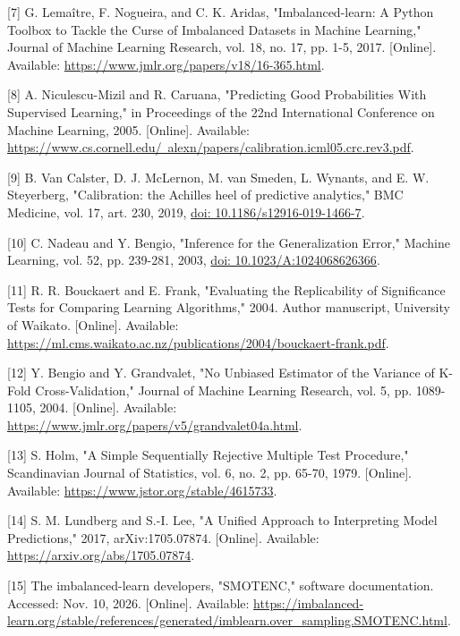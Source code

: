\documentclass[10pt,twocolumn,letterpaper]{article}
\begin{document}
[7] G. Lemaître, F. Nogueira, and C. K. Aridas, "Imbalanced-learn: A Python Toolbox to Tackle the Curse of Imbalanced Datasets in Machine Learning," Journal of Machine Learning Research, vol. 18, no. 17, pp. 1-5, 2017. [Online]. Available: \href{https://www.jmlr.org/papers/v18/16-365.html}{https://www.jmlr.org/papers/v18/16-365.html}.


[8] A. Niculescu-Mizil and R. Caruana, "Predicting Good Probabilities With Supervised Learning," in Proceedings of the 22nd International Conference on Machine Learning, 2005. [Online]. Available: \href{https://www.cs.cornell.edu/~alexn/papers/calibration.icml05.crc.rev3.pdf}{https://www.cs.cornell.edu/~alexn/papers/calibration.icml05.crc.rev3.pdf}.


[9] B. Van Calster, D. J. McLernon, M. van Smeden, L. Wynants, and E. W. Steyerberg, "Calibration: the Achilles heel of predictive analytics," BMC Medicine, vol. 17, art. 230, 2019, \href{https://doi.org/10.1186/s12916-019-1466-7}{doi: 10.1186/s12916-019-1466-7}.


[10] C. Nadeau and Y. Bengio, "Inference for the Generalization Error," Machine Learning, vol. 52, pp. 239-281, 2003, \href{https://doi.org/10.1023/A:1024068626366}{doi: 10.1023/A:1024068626366}.


[11] R. R. Bouckaert and E. Frank, "Evaluating the Replicability of Significance Tests for Comparing Learning Algorithms," 2004. Author manuscript, University of Waikato. [Online]. Available: \href{https://ml.cms.waikato.ac.nz/publications/2004/bouckaert-frank.pdf}{https://ml.cms.waikato.ac.nz/publications/2004/bouckaert-frank.pdf}.


[12] Y. Bengio and Y. Grandvalet, "No Unbiased Estimator of the Variance of K-Fold Cross-Validation," Journal of Machine Learning Research, vol. 5, pp. 1089-1105, 2004. [Online]. Available: \href{https://www.jmlr.org/papers/v5/grandvalet04a.html}{https://www.jmlr.org/papers/v5/grandvalet04a.html}.


[13] S. Holm, "A Simple Sequentially Rejective Multiple Test Procedure," Scandinavian Journal of Statistics, vol. 6, no. 2, pp. 65-70, 1979. [Online]. Available: \href{https://www.jstor.org/stable/4615733}{https://www.jstor.org/stable/4615733}.


[14] S. M. Lundberg and S.-I. Lee, "A Unified Approach to Interpreting Model Predictions," 2017, arXiv:1705.07874. [Online]. Available: \href{https://arxiv.org/abs/1705.07874}{https://arxiv.org/abs/1705.07874}.


[15] The imbalanced-learn developers, "SMOTENC," software documentation. Accessed: Nov. 10, 2026. [Online]. Available: \href{https://imbalanced-learn.org/stable/references/generated/imblearn.over_sampling.SMOTENC.html}{https://imbalanced-learn.org/stable/references/generated/imblearn.over\_sampling.SMOTENC.html}.
\end{document}
